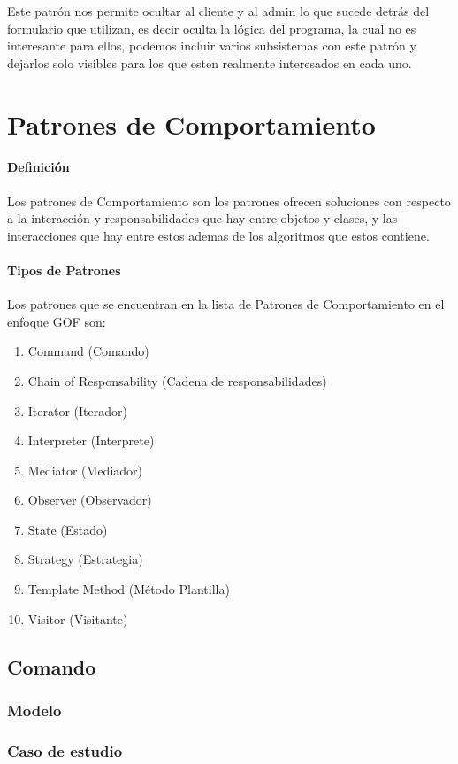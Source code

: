 Este patrón nos permite ocultar al cliente y al admin lo que sucede detrás del formulario que utilizan, es decir oculta la lógica del programa, la cual no es interesante para ellos, podemos incluir varios subsistemas con este patrón y dejarlos solo visibles para los que esten realmente interesados en cada uno. 
\newpage

\section{Patrones de Comportamiento}
\paragraph{Definición}
Los patrones de Comportamiento son los patrones ofrecen soluciones con respecto a la interacción y responsabilidades que hay entre objetos y clases, y las interacciones que hay entre estos ademas de los algoritmos que estos contiene.
\paragraph{Tipos de Patrones}
Los patrones que se encuentran en la lista de Patrones de Comportamiento en el enfoque GOF son:
\begin{enumerate}
	\item Command (Comando)
	\item Chain of Responsability (Cadena de responsabilidades)
	\item Iterator (Iterador)
	\item Interpreter (Interprete)
	\item Mediator (Mediador)
	\item Observer (Observador)
	\item State (Estado)
	\item Strategy (Estrategia)
	\item Template Method (Método Plantilla)
	\item Visitor (Visitante)
\end{enumerate}

\subsection{Comando}
\subsubsection{Modelo}
\newpage
\subsubsection{Caso de estudio}
\newpage

